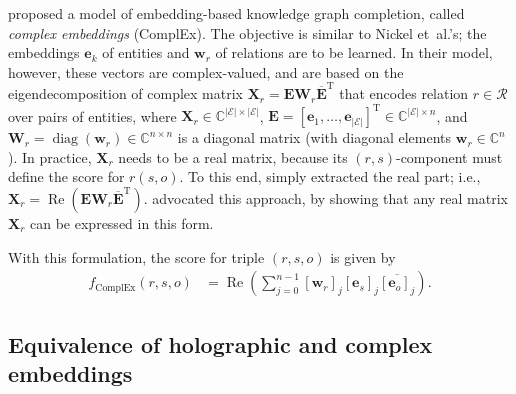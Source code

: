 \documentclass[11pt,a4paper]{article}
\def\mat#1{\boldsymbol{\mathbf{#1}}}
\def\transpose{^{\mathrm{T}}}
\def\Cset{\mathbb{C}}
\def\RE{\mathop{\text{Re}}}
\def\diag{\mathop{\text{diag}}}
\newcommand{\fixme}[1]{}
\begin{document}
\citet{Trouillon:16} proposed
a model of embedding-based knowledge graph completion, called \emph{complex embeddings} (ComplEx).
The objective is similar to Nickel et~al.'s;
the embeddings $\mat{e}_k$ of entities and
$\mat{w}_r$ of relations are to be learned.
In their model, however, these vectors are complex-valued, and are based on the
eigendecomposition of complex \fixme{Hermitian?} matrix $\mat{X}_r = \mat{E} \mat{W}_r \overline{\mat{E}} \transpose$ that encodes
relation $r \in \mathcal{R}$ over pairs of entities,
where $\mat{X}_r \in \Cset^{|\mathcal{E}|\times |\mathcal{E}|}$,
$\mat{E} = [\mat{e}_1, \ldots, \mat{e}_{|\mathcal{E}|}]\transpose \in \Cset^{|\mathcal{E}| \times n}$,
and $\mat{W}_r = \diag(\mat{w}_r) \in \Cset^{n\times n}$ is a diagonal matrix (with diagonal elements $\mat{w}_r \in \Cset^n$).
In practice, $\mat{X}_r$ needs to be a real matrix, because its $(r,s)$-component must define the score for $r(s,o)$.
To this end, \citeauthor{Trouillon:16} simply extracted the real part; i.e.,
$\mat{X}_r = \RE(\mat{E}\mat{W}_r\overline{\mat{E}}\transpose)$.
\citet{Trouillon:16:arXiv} advocated this approach, by showing that
any real matrix $\mat{X}_r$ can be expressed in this form.

With this formulation, the score for triple $(r, s,o)$ is given by
\begin{align}
  f_{\text{ComplEx}}(r,s,o)
  & = \RE \left( \sum_{j=0}^{n-1} [\mat{w}_r]_j [\mat{e}_s]_j \overline{ [\mat{e}_o]_j } \right). \label{eq:complex-embedding-componentwise}
\end{align}

\subsection{Equivalence of holographic and complex embeddings}
\label{sec:equivalence}
\end{document}
